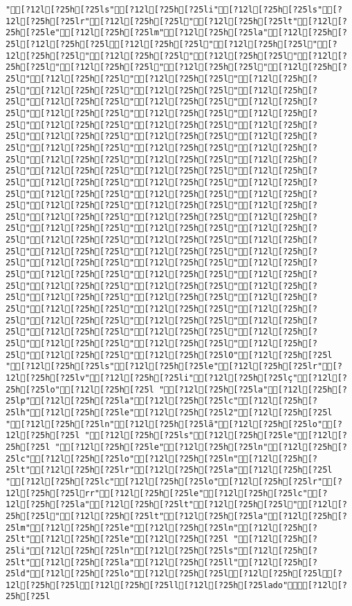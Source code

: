 \documentclass{scrartcl}
\begin{document}
\begin{Verbatim}
"[?12l[?25h[?25ls"[?12l[?25h[?25li"[?12l[?25h[?25ls"[?12l[?25h[?25lr"[?12l[?25h[?25l"[?12l[?25h[?25lt"[?12l[?25h[?25le"[?12l[?25h[?25lm"[?12l[?25h[?25la"[?12l[?25h[?25l[?12l[?25h[?25l[?12l[?25h[?25l"[?12l[?25h[?25l"[?12l[?25h[?25l"[?12l[?25h[?25l"[?12l[?25h[?25l"[?12l[?25h[?25l"[?12l[?25h[?25l"[?12l[?25h[?25l"[?12l[?25h[?25l"[?12l[?25h[?25l"[?12l[?25h[?25l"[?12l[?25h[?25l"[?12l[?25h[?25l"[?12l[?25h[?25l"[?12l[?25h[?25l"[?12l[?25h[?25l"[?12l[?25h[?25l"[?12l[?25h[?25l"[?12l[?25h[?25l"[?12l[?25h[?25l"[?12l[?25h[?25l"[?12l[?25h[?25l"[?12l[?25h[?25l"[?12l[?25h[?25l"[?12l[?25h[?25l"[?12l[?25h[?25l"[?12l[?25h[?25l"[?12l[?25h[?25l"[?12l[?25h[?25l"[?12l[?25h[?25l"[?12l[?25h[?25l"[?12l[?25h[?25l"[?12l[?25h[?25l"[?12l[?25h[?25l"[?12l[?25h[?25l"[?12l[?25h[?25l"[?12l[?25h[?25l"[?12l[?25h[?25l"[?12l[?25h[?25l"[?12l[?25h[?25l"[?12l[?25h[?25l"[?12l[?25h[?25l"[?12l[?25h[?25l"[?12l[?25h[?25l"[?12l[?25h[?25l"[?12l[?25h[?25l"[?12l[?25h[?25l"[?12l[?25h[?25l"[?12l[?25h[?25l"[?12l[?25h[?25l"[?12l[?25h[?25l"[?12l[?25h[?25l"[?12l[?25h[?25l"[?12l[?25h[?25l"[?12l[?25h[?25l"[?12l[?25h[?25l"[?12l[?25h[?25l"[?12l[?25h[?25l"[?12l[?25h[?25l"[?12l[?25h[?25l"[?12l[?25h[?25l"[?12l[?25h[?25l"[?12l[?25h[?25l"[?12l[?25h[?25l"[?12l[?25h[?25l"[?12l[?25h[?25l"[?12l[?25h[?25l"[?12l[?25h[?25l"[?12l[?25h[?25l"[?12l[?25h[?25l"[?12l[?25h[?25l"[?12l[?25h[?25l"[?12l[?25h[?25l"[?12l[?25h[?25l"[?12l[?25h[?25l"[?12l[?25h[?25l"[?12l[?25h[?25l"[?12l[?25h[?25l"[?12l[?25h[?25l"[?12l[?25h[?25l"[?12l[?25h[?25l"[?12l[?25h[?25l"[?12l[?25h[?25lO"[?12l[?25h[?25l "[?12l[?25h[?25ls"[?12l[?25h[?25le"[?12l[?25h[?25lr"[?12l[?25h[?25lv"[?12l[?25h[?25li"[?12l[?25h[?25lç"[?12l[?25h[?25lo"[?12l[?25h[?25l "[?12l[?25h[?25la"[?12l[?25h[?25lp"[?12l[?25h[?25la"[?12l[?25h[?25lc"[?12l[?25h[?25lh"[?12l[?25h[?25le"[?12l[?25h[?25l2"[?12l[?25h[?25l "[?12l[?25h[?25ln"[?12l[?25h[?25lã"[?12l[?25h[?25lo"[?12l[?25h[?25l "[?12l[?25h[?25ls"[?12l[?25h[?25le"[?12l[?25h[?25l "[?12l[?25h[?25le"[?12l[?25h[?25ln"[?12l[?25h[?25lc"[?12l[?25h[?25lo"[?12l[?25h[?25ln"[?12l[?25h[?25lt"[?12l[?25h[?25lr"[?12l[?25h[?25la"[?12l[?25h[?25l "[?12l[?25h[?25lc"[?12l[?25h[?25lo"[?12l[?25h[?25lr"[?12l[?25h[?25lrr"[?12l[?25h[?25le"[?12l[?25h[?25lc"[?12l[?25h[?25la"[?12l[?25h[?25lt"[?12l[?25h[?25l"[?12l[?25h[?25l"[?12l[?25h[?25lt"[?12l[?25h[?25la"[?12l[?25h[?25lm"[?12l[?25h[?25le"[?12l[?25h[?25ln"[?12l[?25h[?25lt"[?12l[?25h[?25le"[?12l[?25h[?25l "[?12l[?25h[?25li"[?12l[?25h[?25ln"[?12l[?25h[?25ls"[?12l[?25h[?25lt"[?12l[?25h[?25la"[?12l[?25h[?25ll"[?12l[?25h[?25ld"[?12l[?25h[?25lo"[?12l[?25h[?25l[?12l[?25h[?25l[?12l[?25h[?25l[?12l[?25h[?25ll[?12l[?25h[?25lado"[?12l[?25h[?25l

\end{Verbatim}
\end{document}
